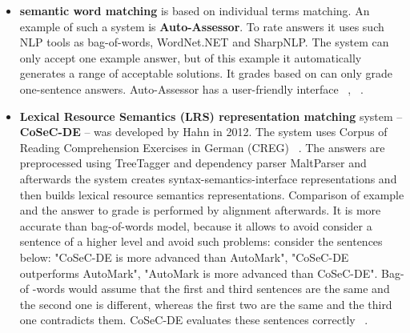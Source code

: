 \documentclass[11pt]{report}
\numberwithin{equation}{section} %
\begin{document}
\begin{itemize}
\begin{itemize}
\end{itemize}
\item \textbf{semantic word matching} is based on individual terms matching. An example of such a system is \textbf{Auto-Assessor}. To rate answers it uses such NLP tools as bag-of-words, WordNet.NET and SharpNLP. The system can only accept one example answer, but of this example it automatically generates a range of acceptable solutions. It grades based on can only grade one-sentence answers. Auto-Assessor has a user-friendly interface ~\cite{Burrows}, ~\cite{Hasanah}. 
\item \textbf{Lexical Resource Semantics (LRS) representation matching} system -- \textbf{CoSeC-DE} -- was developed by Hahn in 2012. The system uses Corpus of Reading Comprehension Exercises in German (CREG) ~\cite{CREG}. The answers are preprocessed using TreeTagger and dependency parser MaltParser and afterwards the system creates syntax-semantics-interface representations and then builds lexical resource semantics representations. Comparison of example and the answer to grade is performed by alignment afterwards. It is more accurate than bag-of-words model, because it allows to avoid consider a sentence of a higher level and avoid such problems: consider the sentences below: "CoSeC-DE is more advanced than AutoMark", "CoSeC-DE outperforms AutoMark", "AutoMark is more advanced than CoSeC-DE". Bag-of -words would assume that the first and third sentences are the same and the second one is different, whereas the first two are the same and the third one contradicts them. CoSeC-DE evaluates these sentences correctly  ~\cite{Hahn}.
\end{itemize}
\end{document}
